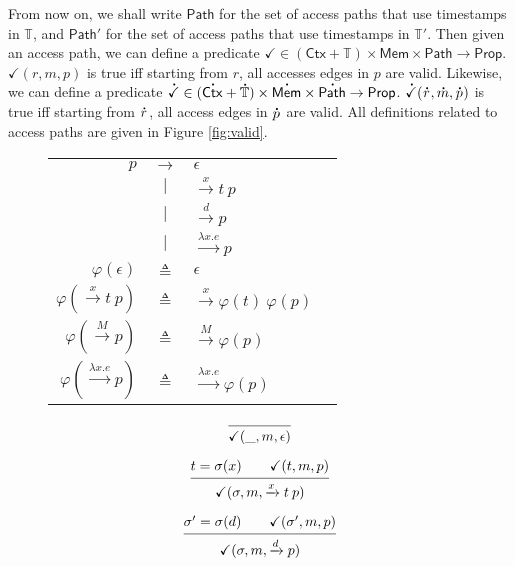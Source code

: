 \documentclass[acmsmall,screen,review]{acmart}\settopmatter{printfolios=true,printccs=false,printacmref=false}
\theoremstyle{acmdefinition}
\newcommand*{\A}[1]{\overset{\,_{\mbox{\Large .}}}{#1}}
\newcommand*{\modid}{d}
\newcommand*{\Time}{\mathbb{T}}
\newcommand*{\ctx}{\sigma}
\newcommand*{\Ctx}{\mathsf{Ctx}}
\newcommand*{\Mem}{\mathsf{Mem}}
\newcommand*{\mem}{m}
\newcommand*{\valid}{\checkmark}
\newcommand*{\Path}{\mathsf{Path}}
\begin{document}
From now on, we shall write $\Path$ for the set of access paths that use timestamps in $\Time$, and $\Path'$ for the set of access paths that use timestamps in $\Time'$.
Then given an access path, we can define a predicate $\valid\in(\Ctx+\Time)\times\Mem\times\Path\rightarrow\mathsf{Prop}$.
$\valid(r,\mem,p)$ is true iff starting from $r$, all accesses edges in $p$ are valid.
Likewise, we can define a predicate $\A\valid\in(\A\Ctx+\A\Time)\times\A\Mem\times\A\Path\rightarrow\mathsf{Prop}$.
$\A\valid(\A{r},\A\mem,\A{p})$ is true iff starting from $\A{r}$, all access edges in $\A{p}$ are valid.
All definitions related to access paths are given in Figure \ref{fig:valid}.
\begin{figure}[t!]
  \centering
  \begin{tabular}{rclr}
    $p$                                   & $\rightarrow$ & $\epsilon$                              \\
                                          & $|$           & $\xrightarrow{x}t\:p$                   \\
                                          & $|$           & $\xrightarrow{\modid}p$                 \\
                                          & $|$           & $\xrightarrow{\lambda x.e}p$            \\
    $\varphi(\epsilon)$                   & $\triangleq$  & $\epsilon$                              \\
    $\varphi(\xrightarrow{x}t\:p)$        & $\triangleq$  & $\xrightarrow{x}\varphi(t)\:\varphi(p)$ \\
    $\varphi(\xrightarrow{M}p)$           & $\triangleq$  & $\xrightarrow{M}\varphi(p)$             \\
    $\varphi(\xrightarrow{\lambda x.e}p)$ & $\triangleq$  & $\xrightarrow{\lambda x.e}\varphi(p)$
  \end{tabular}
  \begin{minipage}{0.3\linewidth}
    \footnotesize
    \[
      \begin{prooftree}
        \infer0{\valid(\_,\mem,\epsilon)}
      \end{prooftree}
    \]

    \[
      \begin{prooftree}
        \hypo{t=\ctx(x)\qquad\valid(t,\mem,p)}
        \infer1{\valid(\ctx,\mem,\xrightarrow{x}t\:p)}
      \end{prooftree}
    \]

    \[
      \begin{prooftree}
        \hypo{\ctx'=\ctx(\modid)\qquad\valid(\ctx',\mem,p)}
        \infer1{\valid(\ctx,\mem,\xrightarrow{\modid}p)}
      \end{prooftree}
    \]


\end{minipage}
\end{figure}
\end{document}
